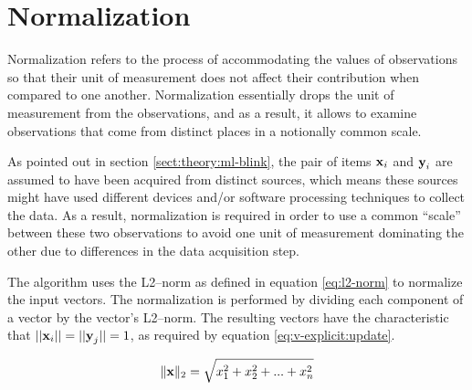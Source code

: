 \section{Normalization} \label{sect:theory:norm}

Normalization refers to the process of accommodating the values of observations so that their unit of measurement does not affect their contribution when compared to one another. Normalization essentially drops the unit of measurement from the observations, and as a result, it allows to examine observations that come from distinct places in a notionally common scale.  \newline

As pointed out in section \ref{sect:theory:ml-blink}, the pair of items $\boldsymbol{\mathbf{x}}_i$ and $\boldsymbol{\mathbf{y}}_i$ are assumed to have been acquired from distinct sources, which means these sources might have used different devices and/or software processing techniques to collect the data. As a result, normalization is required in order to use a common ``scale'' between these two observations to avoid one unit of measurement dominating the other due to differences in the data acquisition step. \newline

The \mlblink algorithm uses the L2--norm as defined in equation \ref{eq:l2-norm} to normalize the input vectors. The normalization is performed by dividing each component of a vector by the vector's L2--norm. The resulting vectors have the characteristic that $||\boldsymbol{\mathbf{x}}_i ||=||\boldsymbol{\mathbf{y}}_j ||=1$, as required by equation \ref{eq:v-explicit:update}.

\begin{equation} \label{eq:l2-norm}
    \lVert \boldsymbol{\mathbf{x}} \rVert_{2} = \sqrt{x^2_1 + x^2_2 + ... + x^2_n}
\end{equation}
